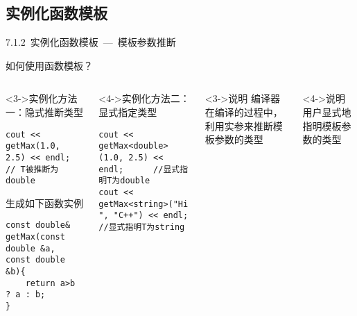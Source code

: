 \subsection{实例化函数模板}

\begin{frame}[fragile]{7.1.2~实例化函数模板\small{~---~模板参数推断}}

如何使用函数模板？ 

\vspace{-4mm}

\begin{columns}[t]

\begin{blueblock}<3->{实例化方法一：隐式推断类型}
\begin{lstlisting}
cout << getMax(1.0, 2.5) << endl; // T被推断为double
\end{lstlisting}
生成如下函数实例
\begin{lstlisting}
const double& getMax(const double &a, const double &b){
    return a>b ? a : b;
}
\end{lstlisting}

\end{blueblock}
\begin{blueblock}<4->{实例化方法二：显式指定类型}
\begin{lstlisting}
cout << getMax<double>(1.0, 2.5) << endl;      //显式指明T为double
cout << getMax<string>("Hi ", "C++") << endl;  //显式指明T为string
\end{lstlisting}
\end{blueblock}

\begin{yellowblock}<3->{说明}
编译器在\alert{编译}的过程中，利用实参来推断模板参数的类型
\end{yellowblock}
\vspace{0.7cm}
\begin{yellowblock}<4->{说明}
用户显式地指明模板参数的类型
\end{yellowblock}

\end{columns}

\end{frame}


